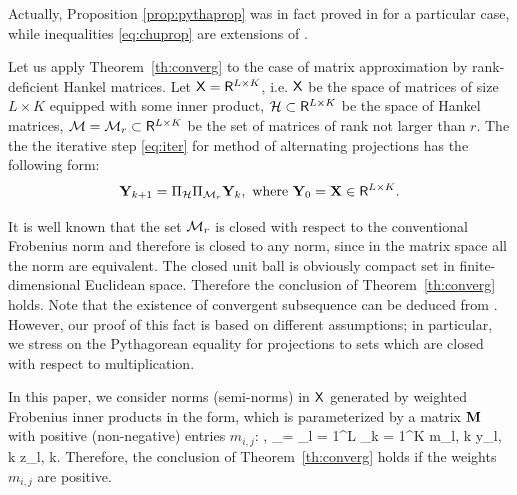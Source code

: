 \documentclass[sii]{ipart}
\begin{document}
Actually, Proposition \ref{prop:pythaprop} was in fact proved in \cite{Gillard.Zhigljavsky2013} for a particular case, while inequalities \eqref{eq:chuprop} are extensions of \cite[inequalities (4.1)]{Chu.etal2003}. 

\medskip
Let us apply Theorem~\ref{th:converg} to the case of matrix approximation by rank-deficient Hankel matrices. Let $\mathsf{X} = \mathsf{R}^{L\times K}$, i.e. $\mathsf{X}$ be the space of matrices of size $L \times K$ equipped with some inner product, $\mathcal{H} \subset \mathsf{R}^{L\times K}$ be the space of Hankel matrices, $\mathcal{M} = \mathcal{M}_r\subset \mathsf{R}^{L\times K}$ be the set of matrices of rank not larger than $r$. The the the iterative step \ref{eq:iter} for method of alternating projections has the following form:
\begin{equation*}
\bfY_{k+1}=\Pi_\calH \Pi_{\calM_r} \bfY_{k}, \mbox{\ where\ } \bfY_{0}=\bfX \in \spaceR^{L\times K}.
\end{equation*}


It is well known that the set $\mathcal{M}_r$ is closed with respect to the conventional Frobenius norm and therefore is closed
to any norm, since in the matrix space all the norm are equivalent. 
The closed unit ball is obviously compact set in finite-dimensional Euclidean space.
Therefore the conclusion of Theorem~\ref{th:converg} holds.
Note that the existence of convergent subsequence can be deduced from \cite{Cadzow1988}. 
However, our proof of this fact is based on different assumptions; in particular, we stress on the Pythagorean equality for projections to sets which are closed with respect to multiplication.

In this paper, we consider norms (semi-norms) in $\mathsf{X}$ generated by weighted Frobenius inner products in the form, which is parameterized by a matrix $\mathbf{M}$ with positive (non-negative) entries $m_{i,j}$:
\be
\label{eq:w_inner_prod}
\langle\bfY, \bfZ\rangle_\bfM = \sum_{l = 1}^L \sum_{k = 1}^K m_{l, k} y_{l, k} z_{l, k}.
\ee
Therefore, the conclusion of Theorem~\ref{th:converg} holds if the weights $m_{i,j}$ are positive.
\end{document}
